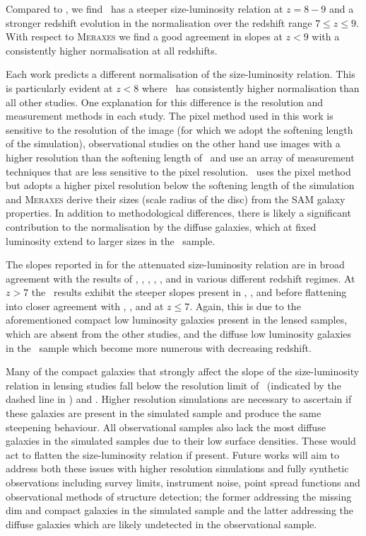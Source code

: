 Compared to \bluetides, we find \flares\ has a steeper size-luminosity relation at $z=8-9$ and a stronger redshift evolution in the normalisation over the redshift range $7\leq z \leq9$. With respect to \textsc{Meraxes} we find a good agreement in slopes at $z<9$ with a consistently higher normalisation at all redshifts.

Each work predicts a different normalisation of the size-luminosity relation. This is particularly evident at $z<8$ where \flares\ has consistently higher normalisation than all other studies. One explanation for this difference is the resolution and measurement methods in each study. The pixel method used in this work is sensitive to the resolution of the image (for which we adopt the softening length of the simulation), observational studies on the other hand use images with a higher resolution than the softening length of \flares\ and use an array of measurement techniques that are less sensitive to the pixel resolution. \bluetides\ uses the pixel method but adopts a higher pixel resolution below the softening length of the simulation and \textsc{Meraxes} derive their sizes (scale radius of the disc) from the SAM galaxy properties. In addition to methodological differences, there is likely a significant contribution to the normalisation by the diffuse galaxies, which at fixed luminosity extend to larger sizes in the \flares\ sample. 

The slopes reported in  for the attenuated size-luminosity relation are in broad agreement with the results of \cite{Grazian_2012}, \cite{Huang_2013}, \cite{Holwerda_2015}, \cite{Shibuya2015}, \cite{Kawamata_2018}, \cite{Bouwens2021} and \cite{Yang2022} in various different redshift regimes. At $z>7$ the \flares\ results exhibit the steeper slopes present in \cite{Kawamata_2018}, \cite{Bouwens2021}, and \cite{Yang2022} before flattening into closer agreement with \cite{Grazian_2012}, \cite{Huang_2013}, \cite{Holwerda_2015} and \cite{Shibuya2015} at $z\leq7$. Again, this is due to the aforementioned compact low luminosity galaxies present in the lensed samples, which are absent from the other studies, and the diffuse low luminosity galaxies in the \flares\ sample which become more numerous with decreasing redshift. 

Many of the compact galaxies that strongly affect the slope of the size-luminosity relation in lensing studies fall below the resolution limit of \flares\ (indicated by the dashed line in ) and \bluetides. Higher resolution simulations are necessary to ascertain if these galaxies are present in the simulated sample and produce the same steepening behaviour. All observational samples also lack the most diffuse galaxies in the simulated samples due to their low surface densities. These would act to flatten the size-luminosity relation if present. Future works will aim to address both these issues with higher resolution simulations and fully synthetic observations including survey limits, instrument noise, point spread functions and observational methods of structure detection; the former addressing the missing dim and compact galaxies in the simulated sample and the latter addressing the diffuse galaxies which are likely undetected in the observational sample.

